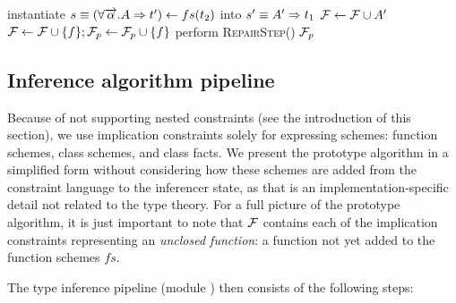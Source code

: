 \begin{algorithm}
\begin{algorithmic}
                    \State instantiate $s \equiv (\forall \overrightarrow{\alpha} . A \Rightarrow t') \gets fs(t_2)$ into $s' \equiv A' \Rightarrow t_1$
                    \State $\mathcal F \gets \mathcal F \cup A'$
                \Else
                    \State $ \mathcal F \gets \mathcal F \cup \{f\}; \mathcal F_p \gets \mathcal F_p \cup \{f\}$ 
                \EndIf
            \EndIf
            \State perform \textsc{RepairStep()}
        \EndWhile
        \State \Return $\mathcal F_p$
    \end{algorithmic}
\end{algorithm}

\subsection{Inference algorithm pipeline}
\label{sec:inferPipeline}

Because of not supporting nested constraints (see the introduction of this section), we use implication constraints solely for expressing schemes: function schemes, class schemes, and class facts. We present the prototype algorithm in a simplified form without considering how these schemes are added from the constraint language to the inferencer state, as that is an implementation-specific detail not related to the type theory. For a full picture of the prototype algorithm, it is just important to note that $\mathcal F$ contains each of the implication constraints representing an \emph{unclosed function}: a function not yet added to the function schemes $fs$.

The type inference pipeline (module ) then consists of the following steps:

